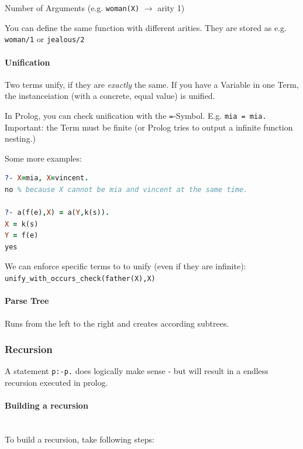 Number of Arguments (e.g. \lstinline|woman(X)| $\rightarrow$ arity 1)

You can define the same function with different arities. They are stored as e.g. \lstinline|woman/1| or \lstinline|jealous/2|

\paragraph{Unification}

Two terms unify, if they are \emph{exactly} the same. If you have a Variable in one Term, the instanceiation (with a concrete, equal value) is unified.

In Prolog, you can check unification with the \lstinline|=|-Symbol. E.g. \lstinline|mia = mia.| Important: the Term must be finite (or Prolog tries to output a infinite function nesting.)

Some more examples:
\begin{lstlisting}[language=Prolog]
?- X=mia, X=vincent.
no % because X cannot be mia and vincent at the same time.

?- a(f(e),X) = a(Y,k(s)).
X = k(s)
Y = f(e)
yes
\end{lstlisting}

We can enforce specific terms to to unify (even if they are infinite):
\lstinline|unify_with_occurs_check(father(X),X)|

\paragraph{Parse Tree}

Runs from the left to the right and creates according subtrees.


\subsubsection{Recursion}

A statement \lstinline|p:-p.| does logically make sense - but will result in a endless recursion executed in prolog.

\paragraph{Building a recursion} \hfill \\

To build a recursion, take following steps:

